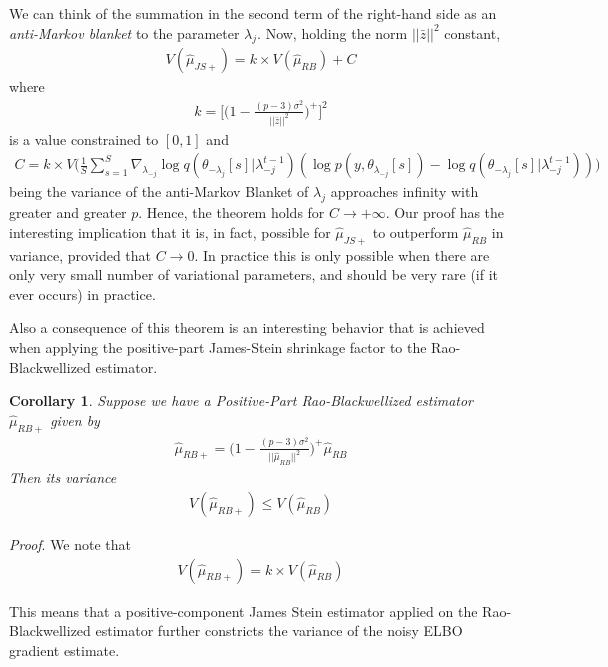 \documentclass{article}
\newtheorem{corollary}{Corollary}
\begin{document}
We can think of the summation in the second term of the right-hand side as an \textit{anti-Markov blanket} to the parameter $\lambda_{j}$. Now, holding the norm $|| \bar{z} ||^2$ constant,
\begin{align*}
    V(\hat\mu_{JS+}) = k \times V(\hat\mu_{RB}) + C
\end{align*}
where
\begin{align*}
    k = \bigg[ \bigg(1 - \frac{(p-3)\sigma^2}{|| \bar{z} ||^2} \bigg)^{+} \bigg]^2
\end{align*}
is a value constrained to $[0,1]$ and
\begin{align*}
    C = k \times V \bigg( \frac{1}{S} \sum^{S}_{s=1} \nabla_{\lambda_{-j}} \log q(\theta_{-\lambda_j}[s] | \lambda^{t-1}_{-j}) (\log p(y, \theta_{\lambda_{-j}}[s]) - \log q(\theta_{-\lambda_j}[s]|\lambda^{t-1}_{-j})) \bigg)
\end{align*}
being the variance of the anti-Markov Blanket of $\lambda_j$ approaches infinity with greater and greater $p$. Hence, the theorem holds for $C \to +\infty$. Our proof has the interesting implication that it is, in fact, possible for $\hat\mu_{JS+}$ to outperform $\hat\mu_{RB}$ in variance, provided that $C \to 0$. In practice this is only possible when there are only very small number of variational parameters, and should be very rare (if it ever occurs) in practice.

Also a consequence of this theorem is an interesting behavior that is achieved when applying the positive-part James-Stein shrinkage factor to the Rao-Blackwellized estimator.

\begin{corollary}
    Suppose we have a Positive-Part Rao-Blackwellized estimator $\hat\mu_{RB+}$ given by
    \begin{align*}
        \hat\mu_{RB+} = \bigg(1 - \frac{(p-3) \sigma^2}{|| \hat\mu_{RB} ||^2} \bigg)^{+} \hat\mu_{RB} 
    \end{align*}
    Then its variance
    \begin{align*}
        V(\hat\mu_{RB+}) \leq  V(\hat\mu_{RB})
    \end{align*}
\end{corollary}

\textit{Proof}. We note that
\begin{align*}
    V(\hat\mu_{RB+}) = k \times V(\hat\mu_{RB})
\end{align*}

This means that a positive-component James Stein estimator applied on the Rao-Blackwellized estimator further constricts the variance of the noisy ELBO gradient estimate.
\end{document}
